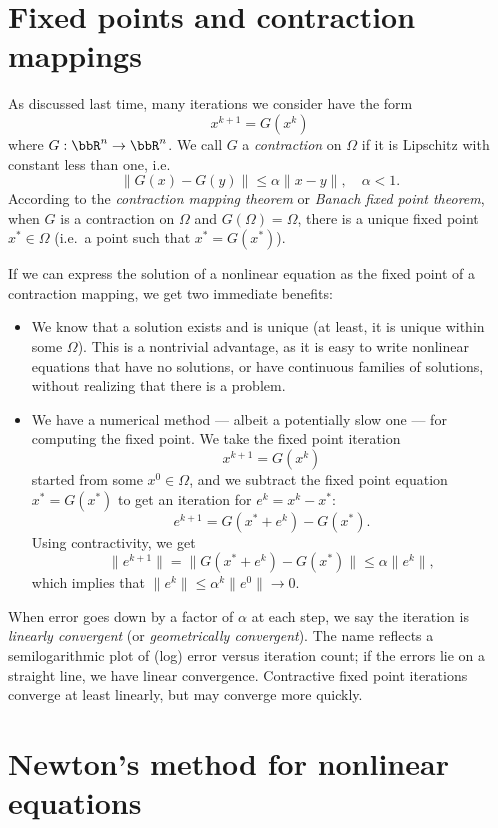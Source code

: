 \documentclass[12pt, leqno]{article} %
\begin{document}

\section*{Fixed points and contraction mappings}

As discussed last time, many iterations we consider have the form
\[
  x^{k+1} = G(x^k)
\]
where $G : \bbR^n \rightarrow \bbR^n$.  We call $G$ a
{\em contraction} on $\Omega$ if it is Lipschitz with constant less
than one, i.e.
\[
  \|G(x)-G(y)\| \leq \alpha \|x-y\|, \quad \alpha < 1.
\]
According to the {\em contraction mapping theorem} or
{\em Banach fixed point theorem}, when $G$ is a contraction
on $\Omega$ and $G(\Omega) = \Omega$, there
is a unique fixed point $x^* \in \Omega$
(i.e.~a point such that $x^* = G(x^*)$).

If we can express the solution of a nonlinear equation as
the fixed point of a contraction mapping, we get two immediate
benefits:
\begin{itemize}
\item We know that a solution exists and is unique (at least, it is
  unique within some $\Omega$).  This is a nontrivial advantage, as
  it is easy to write nonlinear equations that have no solutions,
  or have continuous families of solutions, without realizing that
  there is a problem.
\item We have a numerical method --- albeit a potentially slow one ---
  for computing the fixed point.  We take the fixed point iteration
  \[
    x^{k+1} = G(x^k)
  \]
  started from some $x^0 \in \Omega$, and we subtract the fixed
  point equation $x^* = G(x^*)$ to get an iteration for $e^k = x^k-x^*$:
  \[
    e^{k+1} = G(x^* + e^k) - G(x^*).
  \]
  Using contractivity, we get
  \[
    \|e^{k+1}\| = \|G(x^* + e^k)-G(x^*)\| \leq \alpha \|e^k\|,
  \]
  which implies that $\|e^k\| \leq \alpha^k \|e^0\| \rightarrow 0$.
\end{itemize}
When error goes down by a factor of $\alpha$ at each step, we say
the iteration is {\em linearly convergent} (or {\em geometrically
  convergent}).  The name reflects a semilogarithmic
plot of (log) error versus iteration count; if the errors lie on
a straight line, we have linear convergence.  Contractive fixed point iterations
converge at least linearly, but may converge more quickly.

\section*{Newton's method for nonlinear equations}
\end{document}

